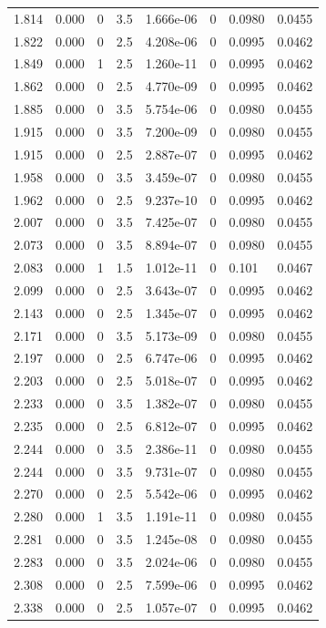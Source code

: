 \documentclass[preview]{standalone}
\begin{document}
{{{\begin{tabular}{L{1.2cm}C{1.2cm} C{0.3cm}C{0.5cm} C{1.4cm}C{1.4cm} C{1.4cm}C{1.4cm}}
  1.814  &  0.000  & 0     & 3.5 &  1.666e-06  & 0  & 0.0980 &  0.0455   \\ 
  1.822  &  0.000  & 0     & 2.5 &  4.208e-06  & 0  & 0.0995 &  0.0462   \\ 
  1.849  &  0.000  & 1     & 2.5 &  1.260e-11  & 0  & 0.0995 &  0.0462   \\ 
  1.862  &  0.000  & 0     & 2.5 &  4.770e-09  & 0  & 0.0995 &  0.0462   \\ 
  1.885  &  0.000  & 0     & 3.5 &  5.754e-06  & 0  & 0.0980 &  0.0455   \\ 
  1.915  &  0.000  & 0     & 3.5 &  7.200e-09  & 0  & 0.0980 &  0.0455   \\ 
  1.915  &  0.000  & 0     & 2.5 &  2.887e-07  & 0  & 0.0995 &  0.0462   \\ 
  1.958  &  0.000  & 0     & 3.5 &  3.459e-07  & 0  & 0.0980 &  0.0455   \\ 
  1.962  &  0.000  & 0     & 2.5 &  9.237e-10  & 0  & 0.0995 &  0.0462   \\ 
  2.007  &  0.000  & 0     & 3.5 &  7.425e-07  & 0  & 0.0980 &  0.0455   \\ 
  2.073  &  0.000  & 0     & 3.5 &  8.894e-07  & 0  & 0.0980 &  0.0455   \\ 
  2.083  &  0.000  & 1     & 1.5 &  1.012e-11  & 0  & 0.101 &  0.0467   \\ 
  2.099  &  0.000  & 0     & 2.5 &  3.643e-07  & 0  & 0.0995 &  0.0462   \\ 
  2.143  &  0.000  & 0     & 2.5 &  1.345e-07  & 0  & 0.0995 &  0.0462   \\ 
  2.171  &  0.000  & 0     & 3.5 &  5.173e-09  & 0  & 0.0980 &  0.0455   \\ 
  2.197  &  0.000  & 0     & 2.5 &  6.747e-06  & 0  & 0.0995 &  0.0462   \\ 
  2.203  &  0.000  & 0     & 2.5 &  5.018e-07  & 0  & 0.0995 &  0.0462   \\ 
  2.233  &  0.000  & 0     & 3.5 &  1.382e-07  & 0  & 0.0980 &  0.0455   \\ 
  2.235  &  0.000  & 0     & 2.5 &  6.812e-07  & 0  & 0.0995 &  0.0462   \\ 
  2.244  &  0.000  & 0     & 3.5 &  2.386e-11  & 0  & 0.0980 &  0.0455   \\ 
  2.244  &  0.000  & 0     & 3.5 &  9.731e-07  & 0  & 0.0980 &  0.0455   \\ 
  2.270  &  0.000  & 0     & 2.5 &  5.542e-06  & 0  & 0.0995 &  0.0462   \\ 
  2.280  &  0.000  & 1     & 3.5 &  1.191e-11  & 0  & 0.0980 &  0.0455   \\ 
  2.281  &  0.000  & 0     & 3.5 &  1.245e-08  & 0  & 0.0980 &  0.0455   \\ 
  2.283  &  0.000  & 0     & 3.5 &  2.024e-06  & 0  & 0.0980 &  0.0455   \\ 
  2.308  &  0.000  & 0     & 2.5 &  7.599e-06  & 0  & 0.0995 &  0.0462   \\ 
  2.338  &  0.000  & 0     & 2.5 &  1.057e-07  & 0  & 0.0995 &  0.0462   \\ 
\hline 
\end{tabular} 

}}}
\end{document}
